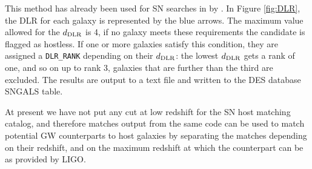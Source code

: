 %
%

This method has already been used for SN searches in by \citet{gupta}. In Figure \ref{fig:DLR}, the DLR for each galaxy is represented by the blue arrows. The maximum value allowed for the $d_{\rm DLR}$ is 4, if no galaxy meets these requirements the candidate is flagged as hostless. If one or more galaxies satisfy this condition, they are assigned a \texttt{DLR\_RANK} depending on their $d_{\rm DLR}$: the lowest $d_{\rm DLR}$ gets a rank of one, and so on up to rank 3, galaxies that are further than the third are excluded. The results are output to a text file and written to the DES database SNGALS table. 

At present we have not put any cut at low redshift for the SN host matching catalog, and therefore matches output from the same code can be used to match potential GW counterparts to host galaxies by separating the matches depending on their redshift, and on the maximum redshift at which the counterpart can be as provided by LIGO.

